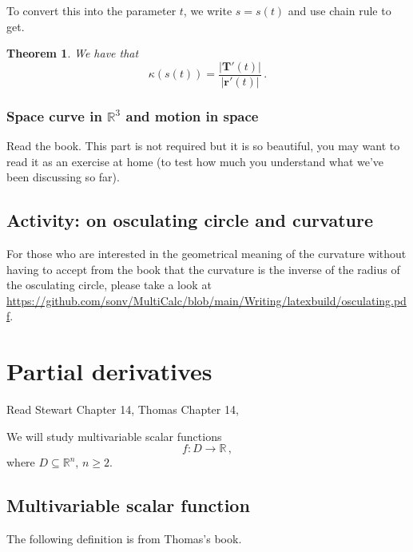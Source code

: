 \documentclass[
]{book}
\newtheorem{theorem}{Theorem}[chapter]
\theoremstyle{definition}
\theoremstyle{definition}
\theoremstyle{definition}
\theoremstyle{definition}
\theoremstyle{remark}
\begin{document}
To convert this into the parameter \(t\), we write \(s= s(t)\) and use chain rule
to get.

\begin{theorem}
We have that
\begin{equation*}
    \kappa(s(t)) =  \frac{|\mathbf{T}'(t)|}{|\mathbf{r}'(t)|}   \,.
\end{equation*}
\end{theorem}

\subsection{\texorpdfstring{Space curve in \(\mathbb{R}^3\) and motion in space}{Space curve in \textbackslash mathbb\{R\}\^{}3 and motion in space}}\label{space-curve-in-mathbbr3-and-motion-in-space}

Read the book. This part is not required but it is so beautiful, you may want to read it
as an exercise at home (to test how much you understand what we've been discussing so far).

\section{Activity: on osculating circle and curvature}\label{activity-on-osculating-circle-and-curvature}

For those who are interested in the geometrical meaning of the curvature without having
to accept from the book that the curvature is the inverse of the radius of the osculating circle,
please take a look at \url{https://github.com/sonv/MultiCalc/blob/main/Writing/latexbuild/osculating.pdf}.

\newpage

\chapter{Partial derivatives}\label{partial-derivatives}

Read Stewart Chapter 14, Thomas Chapter 14,

We will study multivariable scalar functions
\[ f: D \to \mathbb{R}\,,\]
where \(D\subseteq \mathbb{R}^n\), \(n\geq 2\).

\section{Multivariable scalar function}\label{multivariable-scalar-function}

The following definition is from Thomas's book.
\end{document}
